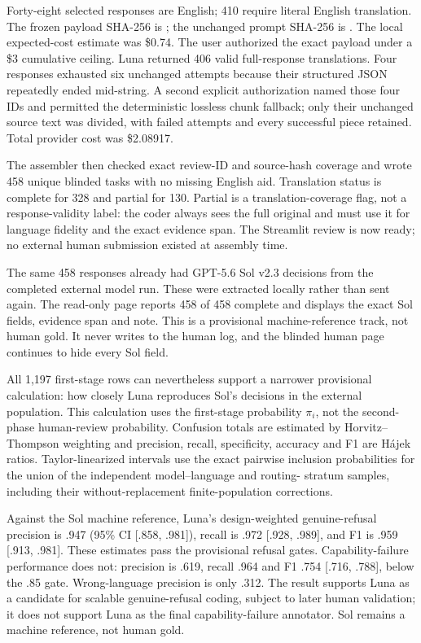 Forty-eight selected responses are English; 410 require literal English
translation. The frozen payload SHA-256 is
;
the unchanged prompt SHA-256 is
.
The local expected-cost estimate was \$0.74. The user authorized the exact
payload under a \$3 cumulative ceiling. Luna returned 406 valid full-response
translations. Four responses exhausted six unchanged attempts because their
structured JSON repeatedly ended mid-string. A second explicit authorization
named those four IDs and permitted the deterministic lossless chunk fallback;
only their unchanged source text was divided, with failed attempts and every
successful piece retained. Total provider cost was \$2.08917.

\pagebreak[4]
The assembler then checked exact review-ID and source-hash coverage and wrote
458 unique blinded tasks with no missing English aid. Translation status is
complete for 328 and partial for 130. Partial is a translation-coverage flag,
not a response-validity label: the coder always sees the full original and must
use it for language fidelity and the exact evidence span. The Streamlit review
is now ready; no external human submission existed at assembly time.

The same 458 responses already had GPT-5.6 Sol v2.3 decisions from the completed
external model run. These were extracted locally rather than sent again. The
read-only  page reports
458 of 458 complete and displays the exact Sol fields, evidence span and note.
This is a provisional machine-reference track, not human gold. It never writes
to the human log, and the blinded human page continues to hide every Sol field.

All 1,197 first-stage rows can nevertheless support a narrower provisional
calculation: how closely Luna reproduces Sol's decisions in the external
population. This calculation uses the first-stage probability $\pi_i$, not the
second-phase human-review probability. Confusion totals are estimated by
Horvitz--Thompson weighting and precision, recall, specificity, accuracy and F1
are Hájek ratios. Taylor-linearized intervals use the exact pairwise inclusion
probabilities for the union of the independent model--language and routing-
stratum samples, including their without-replacement finite-population
corrections.

Against the Sol machine reference, Luna's design-weighted genuine-refusal
precision is .947 (95\% CI [.858, .981]), recall is .972 [.928, .989], and F1
is .959 [.913, .981]. These estimates pass the provisional refusal gates.
Capability-failure performance does not: precision is .619, recall .964 and F1
.754 [.716, .788], below the .85 gate. Wrong-language precision is only .312.
The result supports Luna as a candidate for scalable genuine-refusal coding,
subject to later human validation; it does not support Luna as the final
capability-failure annotator. Sol remains a machine reference, not human gold.

